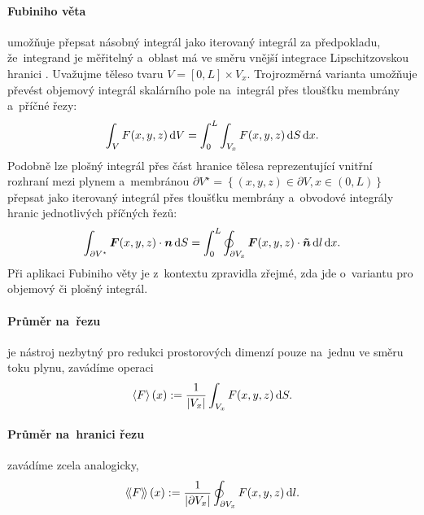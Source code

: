 \paragraph{Fubiniho věta} umožňuje přepsat násobný integrál jako iterovaný integrál za předpokladu, že~integrand je měřitelný a~oblast má ve směru vnější integrace Lipschitzovskou hranici \cite{rudin2021}. Uvažujme těleso tvaru $V=\left[0, L\right]\times V_x$. Trojrozměrná varianta umožňuje převést objemový integrál skalárního pole na~integrál přes tloušťku membrány a~příčné řezy:
\begin{equation}\label{eq:fubini_3D_scalar}
    \int_{V}F(x,y,z)\,\mathrm{d}{V}=\int_0^L\int_{V_{x}}F(x,y,z)\,\mathrm{d}{S}\,\mathrm{d}{x}.
\end{equation}
Podobně lze plošný integrál přes část hranice tělesa reprezentující vnitřní rozhraní mezi plynem a~membránou
$\partial V^{\star}=\left\{\left(x,y,z\right)\in \partial V, x \in \left(0,L\right)\right\}$ přepsat jako iterovaný integrál přes tloušťku membrány a~obvodové integrály hranic jednotlivých příčných řezů:
\begin{equation}\label{eq:fubini_2D}
    \int_{\partial V^{\star}}\bm{F}(x,y,z)\cdot\bm{n}\,\mathrm{d}{S} =
    \int_0^L\oint_{\partial V_x}\bm{F}(x,y,z)\cdot \bm{\tilde{n}}\,\mathrm{d}{l}\,\mathrm{d}{x}.
\end{equation}
Při aplikaci Fubiniho věty je z~kontextu zpravidla zřejmé, zda jde o~variantu pro objemový či plošný integrál.

\paragraph{Průměr na~řezu} je nástroj nezbytný pro redukci prostorových dimenzí pouze na~jednu ve směru toku plynu, zavádíme operaci
\begin{equation}\label{eq:mean_surface}
    \left\langle F\right\rangle(x):=\frac{1}{\left\lvert V_x\right\rvert}\int_{V_x}F(x,y,z) \,\mathrm{d}{S}.
\end{equation}

\paragraph{Průměr na~hranici řezu} zavádíme zcela analogicky, 
\begin{equation}\label{eq:mean_line}
    \left\langle\!\left\langle F \right\rangle\!\right\rangle(x):=\frac{1}{\left\lvert\partial V_x\right\rvert}\oint_{\partial V_x}F(x,y,z) \,\mathrm{d}{l}.
\end{equation}

